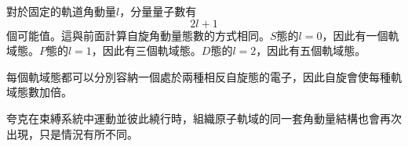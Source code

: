對於固定的軌道角動量\(l\)，分量量子數有
\begin{equation}
2l+1
\end{equation}
個可能值。這與前面計算自旋角動量態數的方式相同。\(S\)態的\(l=0\)，因此有一個軌域態。\(P\)態的\(l=1\)，因此有三個軌域態。\(D\)態的\(l=2\)，因此有五個軌域態。

每個軌域態都可以分別容納一個處於兩種相反自旋態的電子，因此自旋會使每種軌域態數加倍。

\begin{classroomqa}
\end{classroomqa}

夸克在束縛系統中運動並彼此繞行時，組織原子軌域的同一套角動量結構也會再次出現，只是情況有所不同。
